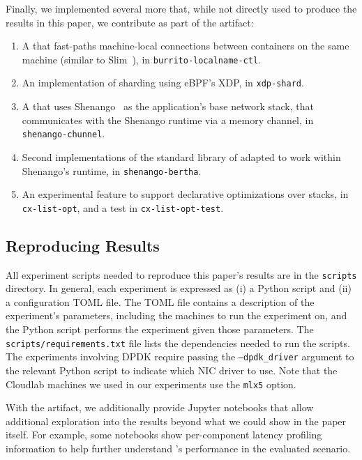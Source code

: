 \begin{appendix}
Finally, we implemented several more \tunnels that, while not directly used to produce the results in this paper, we contribute as part of the artifact:
\begin{enumerate}
    \item A \tunnel that fast-paths machine-local connections between containers on the same machine (similar to Slim~\cite{slim}), in \texttt{burrito-localname-ctl}.
    \item An implementation of sharding using eBPF's XDP, in \texttt{xdp-shard}.
    \item A \tunnel that uses Shenango~\cite{shenango} as the application's base network stack, that communicates with the Shenango runtime via a memory channel, in \texttt{shenango-chunnel}.
    \item Second implementations of the standard library of \tunnels adapted to work within Shenango's runtime, in \texttt{shenango-bertha}.
    \item An experimental \name feature to support declarative optimizations over \tunnel stacks, in \texttt{cx-list-opt}, and a test in \texttt{cx-list-opt-test}.
\end{enumerate}

\subsection{Reproducing Results}

All experiment scripts needed to reproduce this paper's results are in the \texttt{scripts} directory. In general, each experiment is expressed as (i) a Python script and (ii) a configuration TOML file. The TOML file contains a description of the experiment's parameters, including the machines to run the experiment on, and the Python script performs the experiment given those parameters. The \texttt{scripts/requirements.txt} file lists the dependencies needed to run the scripts.
The experiments involving DPDK require passing the \texttt{--dpdk\_driver} argument to the relevant Python script to indicate which NIC driver to use. Note that the Cloudlab machines we used in our experiments use the \texttt{mlx5} option.

With the artifact, we additionally provide Jupyter notebooks that allow additional exploration into the results beyond what we could show in the paper itself. For example, some notebooks show per-component latency profiling information to help further understand \name's performance in the evaluated scenario. 


\end{appendix}
